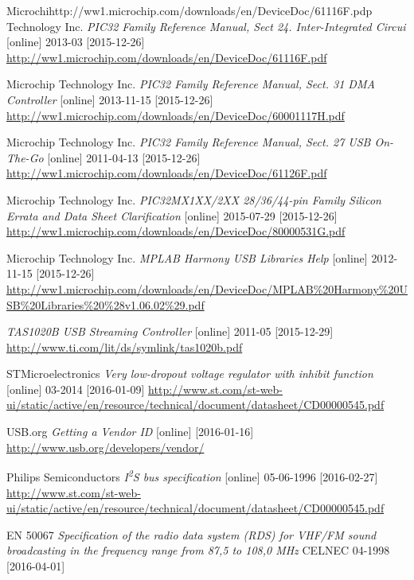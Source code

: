 \documentclass[bc,male,c,dept460]{diploma}						%
\newcommand{\iis}{I\textsuperscript{2}S }
\begin{document}
\begin{thebibliography}{99}
 Microchihttp://ww1.microchip.com/downloads/en/DeviceDoc/61116F.pdp Technology Inc.
\textit{PIC32 Family Reference Manual,  Sect 24. Inter-Integrated Circui} [online] 2013-03 [2015-12-26]
\url{http://ww1.microchip.com/downloads/en/DeviceDoc/61116F.pdf}

 Microchip Technology Inc.
\textit{PIC32 Family Reference Manual, Sect. 31 DMA Controller} [online] 2013-11-15 [2015-12-26]
\url{http://ww1.microchip.com/downloads/en/DeviceDoc/60001117H.pdf}

 Microchip Technology Inc.
\textit{PIC32 Family Reference Manual, Sect. 27 USB On-The-Go} [online] 2011-04-13 [2015-12-26]
\url{http://ww1.microchip.com/downloads/en/DeviceDoc/61126F.pdf}

 Microchip Technology Inc.
\textit{PIC32MX1XX/2XX 28/36/44-pin Family Silicon Errata and Data Sheet Clarification} [online] 2015-07-29 [2015-12-26]
\url{http://ww1.microchip.com/downloads/en/DeviceDoc/80000531G.pdf}

 Microchip Technology Inc.
\textit{MPLAB Harmony USB Libraries Help} [online] 2012-11-15 [2015-12-26]
\url{http://ww1.microchip.com/downloads/en/DeviceDoc/MPLAB\%20Harmony\%20USB\%20Libraries\%20\%28v1.06.02\%29.pdf}

\textit{TAS1020B USB Streaming Controller} [online] 2011-05 [2015-12-29]
\url{http://www.ti.com/lit/ds/symlink/tas1020b.pdf} 

 STMicroelectronics
\textit{Very low-dropout voltage regulator with inhibit function} [online] 03-2014 [2016-01-09]
\url{http://www.st.com/st-web-ui/static/active/en/resource/technical/document/datasheet/CD00000545.pdf}

 USB.org
\textit{Getting a Vendor ID} [online] [2016-01-16]
\url{http://www.usb.org/developers/vendor/}

 Philips Semiconductors
\textit{\iis bus specification} [online] 05-06-1996 [2016-02-27]
\url{http://www.st.com/st-web-ui/static/active/en/resource/technical/document/datasheet/CD00000545.pdf}

 EN 50067
\textit{Specification of the radio data system (RDS) for VHF/FM sound broadcasting in the frequency range from 87,5 to 108,0 MHz} CELNEC 04-1998 [2016-04-01]

\end{thebibliography}
\end{document}

